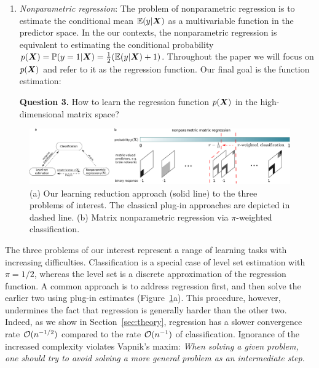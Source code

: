 \documentclass[11pt]{article}
\theoremstyle{definition}
\begin{document}
\begin{enumerate}[label={2.\arabic*},wide, labelwidth=!, labelindent=0pt]
{\bf Question 2.} How to simultaneously estimate the level set and identify important variables in the matrix-valued predictor space, for the goal of interpretable prediction?


\item {\it Nonparametric regression}: The problem of nonparametric regression is to estimate the conditional mean $\mathbb{E}(y|\bm X)$ as a multivariable function in the predictor space. In the our contexts, the nonparametric regression is equivalent to estimating the conditional probability $p(\bm X)=\mathbb{P}(y=1|\bm X)=\frac{1}{2}(\mathbb{E}(y|\bm X)+1)$. Throughout the paper we will focus on $p(\bm X)$ and refer to it as the regression function. Our final goal is the function estimation:

{\bf Question 3.} How to learn the regression function $p(\bm X)$ in the high-dimensional matrix space?
\end{enumerate}


\begin{figure}\centering
\includegraphics[width=1\textwidth]{new_demo.pdf}
\caption{(a) Our learning reduction approach (solid line) to the three problems of interest. The classical plug-in approaches are depicted in dashed line. (b) Matrix nonparametric regression via $\pi$-weighted classification.}\label{fig:diagram}
\end{figure}

The three problems of our interest represent a range of learning tasks with increasing difficulties. Classification is a special case of level set estimation with $\pi=1/2$, whereas the level set is a discrete approximation of the regression function. A common approach is to address regression first, and then solve the earlier two using plug-in estimates (Figure~\ref{fig:diagram}a). This procedure, however, undermines the fact that regression is generally harder than the other two. Indeed, as we show in Section~\ref{sec:theory}, regression has a slower convergence rate $\mathcal{O}(n^{-1/2})$ compared to the rate $\mathcal{O}(n^{-1})$ of classification. Ignorance of the increased complexity violates Vapnik’s maxim: \emph{When solving a given problem, one should try to avoid solving a more general problem as an intermediate step.} 
\end{document}
